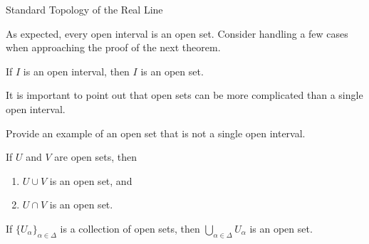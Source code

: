 \begin{section}{Standard Topology of the Real Line}

As expected, every open interval is an open set. Consider handling a few cases when approaching the proof of the next theorem.

\begin{theorem}
If $I$ is an open interval, then $I$ is an open set. 
\end{theorem}


It is important to point out that open sets can be more complicated than a single open interval.

\begin{problem}
Provide an example of an open set that is not a single open interval.
\end{problem}




\begin{theorem}\label{thm:finite union and intersection of open sets}
If $U$ and $V$ are open sets, then 
\begin{enumerate}[label=\textrm{(\alph*)}]
\item $U\cup V$ is an open set, and
\item $U\cap V$ is an open set.
\end{enumerate}
\end{theorem}

\begin{theorem}\label{thm:union of open sets}
If $\{U_{\alpha}\}_{\alpha\in\Delta}$ is a collection of open sets, then $\bigcup_{\alpha\in\Delta} U_{\alpha}$ is an open set.
\end{theorem}


\end{section}
